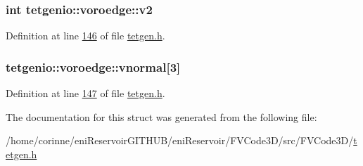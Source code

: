 \subsubsection[{\texorpdfstring{v2}{v2}}]{\setlength{\rightskip}{0pt plus 5cm}int tetgenio\+::voroedge\+::v2}\hypertarget{structtetgenio_1_1voroedge_a19a27882ca68a89123965f7b08e05d55}{}\label{structtetgenio_1_1voroedge_a19a27882ca68a89123965f7b08e05d55}


Definition at line \hyperlink{tetgen_8h_source_l00146}{146} of file \hyperlink{tetgen_8h_source}{tetgen.\+h}.

\subsubsection[{\texorpdfstring{vnormal}{vnormal}}]{ tetgenio\+::voroedge\+::vnormal\mbox{[}3\mbox{]}}\hypertarget{structtetgenio_1_1voroedge_afea78ad75784a868068e6d86c21531a3}{}\label{structtetgenio_1_1voroedge_afea78ad75784a868068e6d86c21531a3}


Definition at line \hyperlink{tetgen_8h_source_l00147}{147} of file \hyperlink{tetgen_8h_source}{tetgen.\+h}.



The documentation for this struct was generated from the following file\+:\begin{DoxyCompactItemize}
\item 
/home/corinne/eni\+Reservoir\+G\+I\+T\+H\+U\+B/eni\+Reservoir/\+F\+V\+Code3\+D/src/\+F\+V\+Code3\+D/\hyperlink{tetgen_8h}{tetgen.\+h}\end{DoxyCompactItemize}
